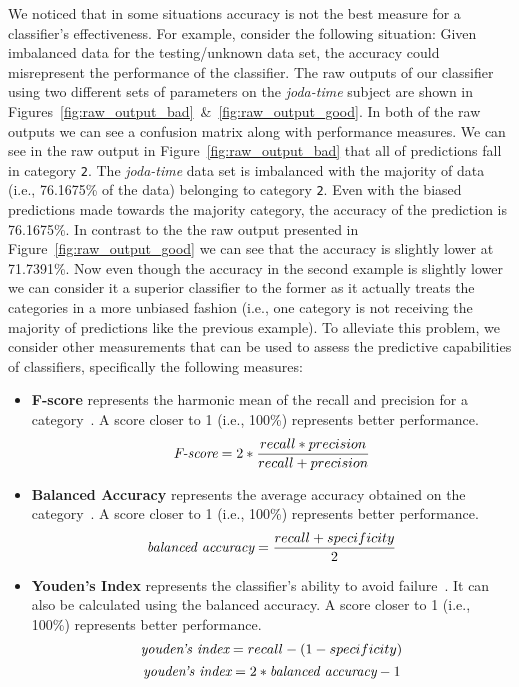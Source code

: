 We noticed that in some situations accuracy is not the best measure for a classifier's effectiveness. For example, consider the following situation: Given imbalanced data for the testing/unknown data set, the accuracy could misrepresent the performance of the classifier. The raw outputs of our classifier using two different sets of parameters on the \emph{joda-time} subject are shown in Figures~\ref{fig:raw_output_bad}~\&~\ref{fig:raw_output_good}. In both of the raw outputs we can see a confusion matrix along with performance measures. We can see in the raw output in Figure~\ref{fig:raw_output_bad} that all of predictions fall in category \texttt{2}. The \emph{joda-time} data set is imbalanced with the majority of data (i.e., 76.1675\% of the data) belonging to category \texttt{2}. Even with the biased predictions made towards the majority category, the accuracy of the prediction is 76.1675\%. In contrast to the the raw output presented in Figure~\ref{fig:raw_output_good} we can see that the accuracy is slightly lower at 71.7391\%. Now even though the accuracy in the second example is slightly lower we can consider it a superior classifier to the former as it actually treats the categories in a more unbiased fashion (i.e., one category is not receiving the majority of predictions like the previous example). To alleviate this problem, we consider other measurements that can be used to assess the predictive capabilities of classifiers, specifically the following measures:

\begin{itemize}
  \item \textbf{F-score} represents the harmonic mean of the recall and precision for a category~\cite{SJS06}. A score closer to 1 (i.e., 100\%) represents better performance.
  \begin{equation}
    \emph{$\text{F-score} = 2*\frac{recall * precision}{recall + precision}$}
    \label{equ:f_score}
  \end{equation}

  \item \textbf{Balanced Accuracy} represents the average accuracy obtained on the category~\cite{BOSB10, SJS06}. A score closer to 1 (i.e., 100\%) represents better performance.
  \begin{equation}
    \emph{$\text{balanced accuracy} = \frac{recall + specificity}{2}$}
    \label{equ:balanced_area_under_curve}
  \end{equation}

  \item \textbf{Youden's Index} represents the classifier's ability to avoid failure~\cite{SJS06}. It can also be calculated using the balanced accuracy. A score closer to 1 (i.e., 100\%) represents better performance.
  \begin{equation}
    \emph{$\text{youden's index} = recall - ( 1 - specificity)$}
    \label{equ:youden_index_a}
  \end{equation}
  \begin{equation}
    \emph{$\text{youden's index} = 2 * \text{balanced accuracy} - 1$}
    \label{equ:youden_index_b}
  \end{equation}
\end{itemize}

